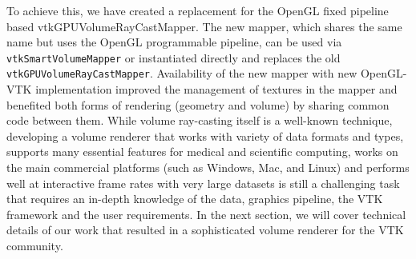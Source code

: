 To achieve this, we have created a replacement for the OpenGL fixed pipeline based
vtkGPUVolumeRayCastMapper. The new mapper, which shares the same name but uses
the OpenGL programmable pipeline, can be used via \texttt{vtkSmartVolumeMapper} or
instantiated directly and replaces the old \texttt{vtkGPUVolumeRayCastMapper}.
Availability of the new mapper with new OpenGL-VTK implementation improved the
management of textures in the mapper and benefited both forms of rendering
(geometry and volume) by sharing common code between them. While volume
ray-casting itself is a well-known technique, developing a volume renderer that
works with variety of data formats and types, supports many essential features
for medical and scientific computing, works on the main commercial platforms
(such as Windows, Mac, and Linux) and performs well at interactive frame rates
with very large datasets is still a challenging task that requires an in-depth
knowledge of the data, graphics pipeline, the VTK framework and the user
requirements.  In the next section, we will cover technical details of our work
that resulted in a sophisticated volume renderer for the VTK community.
